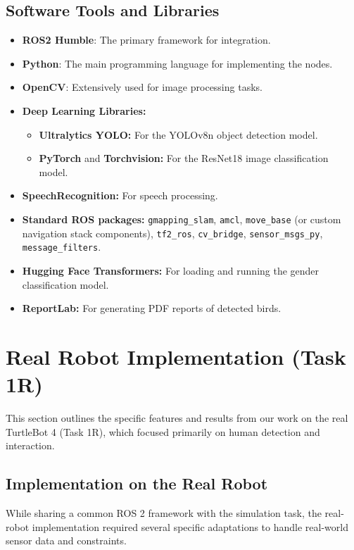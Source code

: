\documentclass[a4paper]{article}
\begin{document}
\subsection{Software Tools and Libraries}
\begin{itemize}
    \item \textbf{ROS2 Humble}: The primary framework for integration.
    \item \textbf{Python}: The main programming language for implementing the nodes.
    \item \textbf{OpenCV}: Extensively used for image processing tasks.
    \item \textbf{Deep Learning Libraries:}
        \begin{itemize}
            \item \textbf{Ultralytics YOLO:} For the YOLOv8n object detection model.
            \item \textbf{PyTorch} and \textbf{Torchvision:} For the ResNet18 image classification model.
        \end{itemize}
    \item \textbf{SpeechRecognition:} For speech processing.
    \item \textbf{Standard ROS packages:} \texttt{gmapping\_slam}, \texttt{amcl}, \texttt{move\_base} (or custom navigation stack components), \texttt{tf2\_ros}, \texttt{cv\_bridge}, \texttt{sensor\_msgs\_py}, \texttt{message\_filters}.
    \item \textbf{Hugging Face Transformers:} For loading and running the gender classification model.
    \item \textbf{ReportLab:} For generating PDF reports of detected birds.
\end{itemize}

\section{Real Robot Implementation (Task 1R)}

This section outlines the specific features and results from our work on the real TurtleBot 4 (Task 1R), which focused primarily on human detection and interaction.

\subsection{Implementation on the Real Robot}

While sharing a common ROS 2 framework with the simulation task, the real-robot implementation required several specific adaptations to handle real-world sensor data and constraints.
\end{document}
